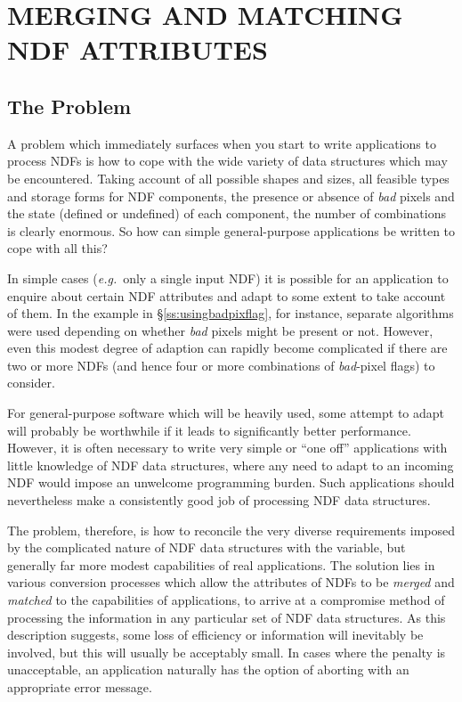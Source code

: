 \documentclass[twoside,11pt]{article}
\newcommand{\xlabel}[1]{}
\newcommand{\st}[1]{{\em{#1}}}
\begin{document}
\section{\xlabel{merging_and_matching_ndf_attributes}MERGING AND MATCHING NDF ATTRIBUTES}

\subsection{\xlabel{the_problem}The Problem}

A problem which immediately surfaces when you start to write applications to
process NDFs is how to cope with the wide variety of data structures which
may be encountered.
Taking account of all possible shapes and sizes, all feasible types and storage
forms for NDF components, the presence or absence of \st{bad\/} pixels and the
state (defined or undefined) of each component, the number of combinations is
clearly enormous.
So how can simple general-purpose applications be written to cope with all 
this?

In simple cases (\st{e.g.}\ only a single input NDF) it is possible for an
application to enquire about certain NDF attributes and adapt to some extent
to take account of them. 
In the example in \S\ref{ss:usingbadpixflag}, for instance, separate
algorithms were used depending on whether \st{bad\/} pixels might be present
or not. 
However, even this modest degree of adaption can rapidly become complicated
if there are two or more NDFs (and hence four or more combinations of
\st{bad\/}-pixel flags) to consider.  

For general-purpose software which will be heavily used, some attempt to 
adapt will probably be worthwhile if it leads to significantly better
performance. 
However, it is often necessary to write very simple or ``one off''
applications with little knowledge of NDF data structures, where any need to
adapt to an incoming NDF would impose an unwelcome programming burden. 
Such applications should nevertheless make a consistently good job of
processing NDF data structures. 

The problem, therefore, is how to reconcile the very diverse requirements
imposed by the complicated nature of NDF data structures with the variable,
but generally far more modest capabilities of real applications. 
The solution lies in various conversion processes which allow the attributes
of NDFs to be \st{merged\/} and \st{matched\/} to the capabilities of
applications, to arrive at a compromise method of processing the information
in any particular set of NDF data structures. 
As this description suggests, some loss of efficiency or information will
inevitably be involved, but this will usually be acceptably small.
In cases where the penalty is unacceptable, an application naturally has the
option of aborting with an appropriate error message. 
\end{document}
